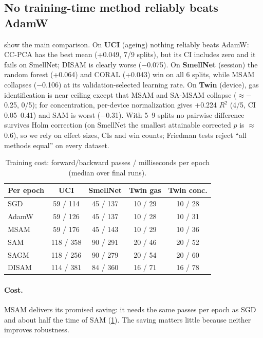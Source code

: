 \documentclass[10pt,twocolumn,letterpaper]{article}
\begin{document}
\subsection{No training-time method reliably beats AdamW}
\label{sec:main}
 show the main comparison. On \textbf{UCI} (ageing) nothing reliably beats AdamW: CC-PCA has
the best mean (+0.049, 7/9 splits), but its CI includes zero and it fails on SmellNet; DISAM is clearly worse
($-$0.075). On \textbf{SmellNet} (session) the random forest (+0.064) and CORAL (+0.043) win on all 6 splits, while
MSAM collapses ($-$0.106) at its validation-selected learning rate. On \textbf{Twin} (device), gas identification is
near ceiling except that MSAM and SA-MSAM collapse ($\approx-$0.25, 0/5); for concentration, per-device
normalization gives +0.224 $R^2$ (4/5, CI 0.05--0.41) and SAM is worst ($-$0.31). With 5--9 splits no pairwise
difference survives Holm correction (on SmellNet the smallest attainable corrected $p$ is $\approx$0.6), so we rely
on effect sizes, CIs and win counts; Friedman tests reject ``all methods equal'' on every dataset.

\begin{table}[t]
\centering\footnotesize\setlength{\tabcolsep}{4pt}
\begin{tabular}{@{}lcccc@{}}
\toprule
Per epoch & UCI & SmellNet & Twin gas & Twin conc. \\
\midrule
SGD   & 59 / 114 & 45 / 137 & 10 / 29 & 10 / 28 \\
AdamW & 59 / 126 & 45 / 137 & 10 / 28 & 10 / 31 \\
MSAM  & 59 / 176 & 45 / 143 & 10 / 29 & 10 / 36 \\
SAM   & 118 / 358 & 90 / 291 & 20 / 46 & 20 / 52 \\
SAGM  & 118 / 256 & 90 / 279 & 20 / 54 & 20 / 60 \\
DISAM & 114 / 381 & 84 / 360 & 16 / 71 & 16 / 78 \\
\bottomrule
\end{tabular}
\caption{Training cost: forward/backward passes / milliseconds per epoch (median over final runs).}
\label{tab:cost}
\end{table}

\paragraph{Cost.} MSAM delivers its promised saving: it needs the same passes per epoch as SGD and about half the
time of SAM (\cref{tab:cost}). The saving matters little because neither improves robustness.
\end{document}
